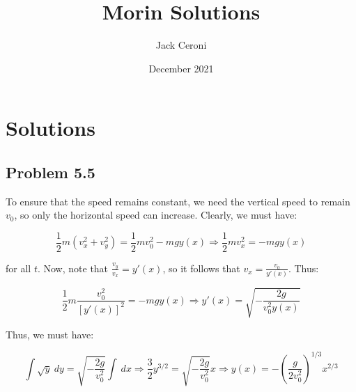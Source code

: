 \documentclass[10pt, oneside]{amsart}
\title{Morin Solutions}
\author{Jack Ceroni}
\date{December 2021}
\begin{document}
    \maketitle

    \tableofcontents

    \vspace{.25in}

    \section{Solutions}

    \hrulefill

    \subsection{Problem 5.5}

    To ensure that the speed remains constant, we need the vertical speed to remain $v_0$, so only the horizontal speed can increase. Clearly, we must have:

    $$\frac{1}{2} m (v_x^2 + v_y^2) = \frac{1}{2} m v_0^2 - mg y(x) \Rightarrow \frac{1}{2} mv_x^2 = - mgy(x)$$

    for all $t$. Now, note that $\frac{v_y}{v_x} = y'(x)$, so it follows that $v_x = \frac{v_0}{y'(x)}$. Thus:

    $$\frac{1}{2} m \frac{v_0^2}{[ y'(x) ]^2} = - mg y(x) \Rightarrow y'(x) = \sqrt{-\frac{2g}{v_0^2 y(x)}}$$

    Thus, we must have:

    $$\displaystyle\int \sqrt{y} \ dy = \sqrt{-\frac{2g}{v_0^2}} \displaystyle\int \ dx \Rightarrow \frac{3}{2} y^{3/2} =  \sqrt{-\frac{2g}{v_0^2}} x \Rightarrow \boxed{y(x) = - \left( \frac{g}{2 v_0^2} \right)^{1/3} x^{2/3}}$$

    
\end{document}
